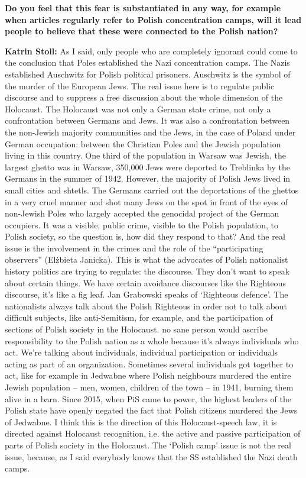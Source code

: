 \textbf{Do you feel that this fear is substantiated in any way, for example when articles regularly refer to Polish concentration camps, will it lead people to believe that these were connected to the Polish nation?}

\textbf{Katrin Stoll:} As I said, only people who are completely ignorant could come to the conclusion that Poles established the Nazi concentration camps. The Nazis established Auschwitz for Polish political prisoners. Auschwitz is the symbol of the murder of the European Jews. The real issue here is to regulate public discourse and to suppress a free discussion about the whole dimension of the Holocaust. The Holocaust was not only a German state crime, not only a confrontation between Germans and Jews. It was also a confrontation between the non-Jewish majority communities and the Jews, in the case of Poland under German occupation: between the Christian Poles and the Jewish population living in this country. One third of the population in Warsaw was Jewish, the largest ghetto was in Warsaw, 350,000 Jews were deported to Treblinka by the Germans in the summer of 1942. However, the majority of Polish Jews lived in small cities and shtetls. The Germans carried out the deportations of the ghettos in a very cruel manner and shot many Jews on the spot in front of the eyes of non-Jewish Poles who largely accepted the genocidal project of the German occupiers. It was a visible, public crime, visible to the Polish population, to Polish society, so the question is, how did they respond to that?  And the real issue is the involvement in the crimes and the role of the “participating observers” (Elżbieta Janicka). This is what the advocates of Polish nationalist history politics are trying to regulate: the discourse. They don’t want to speak about certain things. We have certain avoidance discourses like the Righteous discourse, it’s like a fig leaf. Jan Grabowski speaks of ‘Righteous defence’. The nationalists always talk about the Polish Righteous in order not to talk about difficult subjects, like anti-Semitism, for example, and the participation of sections of Polish society in the Holocaust. no sane person would ascribe responsibility to the Polish nation as a whole because it’s always individuals who act. We’re talking about individuals, individual participation or individuals acting as part of an organization. Sometimes several individuals got together to act, like for example in Jedwabne where Polish neighbours murdered the entire Jewish population – men, women, children of the town – in 1941, burning them alive in a barn. Since 2015, when PiS came to power, the highest leaders of the Polish state have openly negated the fact that Polish citizens murdered the Jews of Jedwabne. I think this is the direction of this Holocaust-speech law, it is directed against Holocaust recognition, i.e. the active and passive participation of parts of Polish society in the Holocaust. The ‘Polish camp’ issue is not the real issue, because, as I said everybody knows that the SS established the Nazi death camps. 

